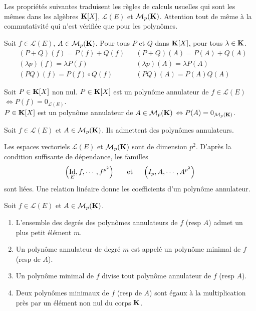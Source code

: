 Les propriétés suivantes traduisent les règles de calculs usuelles qui sont les mêmes dans les algèbres $\mathbf{K}[X]$, $\mathcal{L}(E)$ et $\mathcal{M}_p(\mathbf{K})$. Attention tout de même à la commutativité qui n'est vérifiée que pour les polynômes.
\begin{propn}
  Soit $f\in \mathcal{L}(E)$, $A \in \mathcal{M}_p(\mathbf{K})$. Pour tous $P$ et $Q$ dans $\mathbf{K}[X]$, pour tous $\lambda \in \mathbf{K}$.
\[
\begin{aligned}
  &(P+Q)(f) = P(f) + Q(f) & &(P+Q)(A) = P(A) + Q(A) \\
  &(\lambda p)(f) = \lambda P(f) & &(\lambda p)(A) = \lambda P(A)\\
  &(PQ)(f) = P(f) \circ Q(f) & &(PQ)(A) = P(A) Q(A)
\end{aligned}
\]
\end{propn}
\begin{defi} Soit $P \in \mathbf{K}[X]$ non nul.\newline
  $P \in \mathbf{K}[X]$ est un polynôme annulateur de $f\in \mathcal{L}(E)$ $\Leftrightarrow P(f) = 0_{\mathcal{L}(E)}$.\\
  $P \in \mathbf{K}[X]$ est un polynôme annulateur de $A\in \mathcal{M}_p(\mathbf{K})$ $\Leftrightarrow P(A) = 0_{\mathcal{M}_{p}(\mathbf{K})}$.
\end{defi}
\begin{propn}
  Soit $f \in \mathcal{L}(E)$ et $A \in \mathcal{M}_p(\mathbf{K})$. Ils admettent des polynômes annulateurs.
\end{propn}
\begin{demo}
  Les espaces vectoriels $\mathcal{L}(E)$ et $\mathcal{M}_p(\mathbf{K})$ sont de dimension $p^2$. D'après la condition suffisante de dépendance,  les familles
  \[
    \left( \mathop{\mathrm{Id}}_E, f, \cdots , f^{p^2}\right) \hspace{0.5cm} \text{ et} \hspace{0.5cm} \left( I_p, A, \cdots , A^{p^2}\right)
  \]
sont liées. Une relation linéaire donne les coefficients d'un polynôme annulateur.
\end{demo}
\begin{propn}
  Soit $f \in \mathcal{L}(E)$ et $A \in \mathcal{M}_p(\mathbf{K})$.
  \begin{enumerate}
    \item L'ensemble des degrés des polynômes annulateurs de $f$ (resp $A$) admet un plus petit élément $m$.
    \item Un polynôme annulateur de degré $m$ est appelé un polynôme minimal de $f$ (resp de $A$).
    \item Un polynôme minimal de $f$ divise tout polynôme annulateur de $f$ (resp $A$).
    \item Deux polynômes minimaux de $f$ (resp de $A$) sont égaux à la multiplication près par un élément non nul du corps $\mathbf{K}$.
  \end{enumerate} 
\end{propn}

